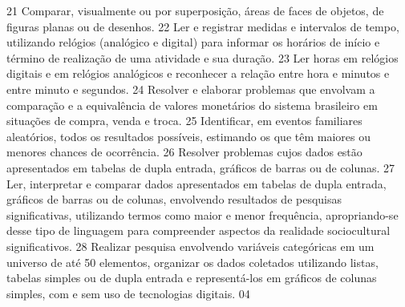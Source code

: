 {{{{{						}
						{21}{%
							Comparar, visualmente ou por superposição, áreas de faces de objetos, de figuras
							planas ou de desenhos.
						}
						{22}{%
							Ler e registrar medidas e intervalos de tempo, utilizando relógios (analógico e
							digital) para informar os horários de início e término de realização de uma atividade e sua
							duração.
						}
						{23}{%
							Ler horas em relógios digitais e em relógios analógicos e reconhecer a relação
							entre hora e minutos e entre minuto e segundos.
						}
						{24}{%
							Resolver e elaborar problemas que envolvam a comparação e a equivalência de
							valores monetários do sistema brasileiro em situações de compra, venda e troca.
						}
						{25}{%
							Identificar, em eventos familiares aleatórios, todos os resultados possíveis,
							estimando os que têm maiores ou menores chances de ocorrência.
						}
						{26}{%
							Resolver problemas cujos dados estão apresentados em tabelas de dupla
							entrada, gráficos de barras ou de colunas.
						}
						{27}{%
							Ler, interpretar e comparar dados apresentados em tabelas de dupla entrada,
							gráficos de barras ou de colunas, envolvendo resultados de pesquisas significativas, utilizando
							termos como maior e menor frequência, apropriando-se desse tipo de linguagem para
							compreender aspectos da realidade sociocultural significativos.
						}
						{28}{%
							Realizar pesquisa envolvendo variáveis categóricas em um universo de até 50
							elementos, organizar os dados coletados utilizando listas, tabelas simples ou de dupla entrada
							e representá-los em gráficos de colunas simples, com e sem uso de tecnologias digitais.
						}
				}
			}
			{04}{%
				}}}
